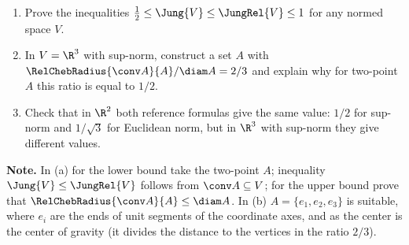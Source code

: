 \documentclass[a4paper,12pt]{report}
\begin{document}
\begin{task}
\begin{enumerate}[label=\textup{(\alph*)}]
\item Prove the inequalities $\frac12 \le \Jung{V} \le \JungRel{V} \le 1$ for any normed space $V$.
\item In $V = \R^3$ with sup-norm, construct a set $A$ with $\RelChebRadius{\conv A}{A}/\diam A = 2/3$ and explain why for two-point $A$ this ratio is equal to $1/2$.
\item Check that in $\R^2$ both reference formulas give the same value\textup{:} $1/2$ for sup-norm and $1/\sqrt3$ for Euclidean norm, but in $\R^3$ with sup-norm they give different values.
\end{enumerate}

\textbf{Note.} In \textup{(a)} for the lower bound take the two-point $A$\textup{;} inequality $\Jung{V} \le \JungRel{V}$ follows from $\conv A \subseteq V$\textup{;} for the upper bound prove that $\RelChebRadius{\conv A}{A} \le \diam A$. In \textup{(b)} $A = \{e_1, e_2, e_3\}$ is suitable, where $e_i$ are the ends of unit segments of the coordinate axes, and as the center is the center of gravity \textup{(}it divides the distance to the vertices in the ratio $2/3$\textup{)}.
\end{task}
\end{document}
